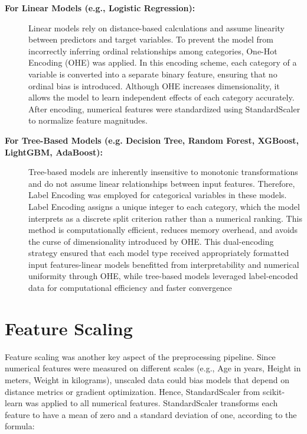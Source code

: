 \begin{description}
    \item[\textbf{For Linear Models (e.g., Logistic Regression):}]
    Linear models rely on distance-based calculations and assume linearity between predictors and target variables.
    To prevent the model from incorrectly inferring ordinal relationships among categories, One-Hot Encoding (OHE) was applied.
    In this encoding scheme, each category of a variable is converted into a separate binary feature, ensuring that no ordinal bias is introduced.
    Although OHE increases dimensionality, it allows the model to learn independent effects of each category accurately.
    After encoding, numerical features were standardized using StandardScaler to normalize feature magnitudes.

    \item[\textbf{For Tree-Based Models (e.g. Decision Tree, Random Forest, XGBoost, LightGBM, AdaBoost):}]
    Tree-based models are inherently insensitive to monotonic transformations and do not assume linear relationships between input features.
    Therefore, Label Encoding was employed for categorical variables in these models.
    Label Encoding assigns a unique integer to each category, which the model interprets as a discrete split criterion rather than a numerical ranking.
    This method is computationally efficient, reduces memory overhead, and avoids the curse of dimensionality introduced by OHE. This dual-encoding strategy ensured that each model type received appropriately formatted input features-linear models benefitted from interpretability and numerical uniformity through OHE, while tree-based models leveraged label-encoded data for computational efficiency and faster convergence
\end{description}



\section{Feature Scaling}\label{sec:feature-scaling}

Feature scaling was another key aspect of the preprocessing pipeline.
Since numerical features were measured on different scales (e.g., Age in years, Height in meters, Weight in kilograms), unscaled data could bias models that depend on distance metrics or gradient optimization.
Hence, StandardScaler from scikit-learn was applied to all numerical features.
StandardScaler transforms each feature to have a mean of zero and a standard deviation of one, according to the formula:

